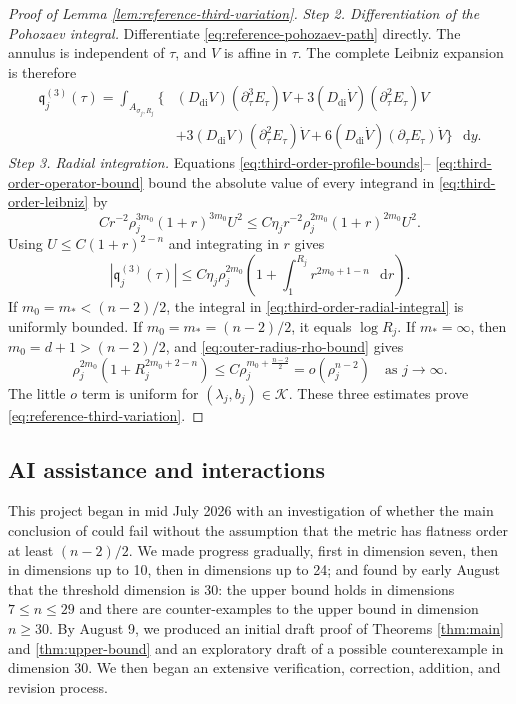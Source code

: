 \documentclass[11pt]{article}
\numberwithin{equation}{section}
\theoremstyle{remark}
\newcommand{\dd}{\mathop{}\!\mathrm{d}}
\begin{document}
\begin{proof}[Proof of Lemma  \ref{lem:reference-third-variation}]
\emph{Step 2. Differentiation of the Pohozaev integral.}
Differentiate \eqref{eq:reference-pohozaev-path} directly. The annulus is
independent of \(\tau\), and \(V\) is affine in \(\tau\). The complete Leibniz
expansion is therefore
\begin{equation}\label{eq:third-order-leibniz}
 \begin{aligned}
 \mathfrak q_j^{(3)}(\tau)
 =\int_{A_{\sigma_j,R_j}}\bigl\{
 &(D_{\mathrm{di}}V)(\partial_\tau^3E_\tau)V
 +3(D_{\mathrm{di}}\dot V)(\partial_\tau^2E_\tau)V\\
 &+3(D_{\mathrm{di}}V)(\partial_\tau^2E_\tau)\dot V
 +6(D_{\mathrm{di}}\dot V)(\partial_\tau E_\tau)\dot V
 \bigr\}\,\dd y.
\end{aligned}
\end{equation}
\emph{Step 3. Radial integration.}
Equations \eqref{eq:third-order-profile-bounds}--%
\eqref{eq:third-order-operator-bound} bound the absolute value of every
integrand in \eqref{eq:third-order-leibniz} by
\[
 Cr^{-2}\rho_j^{3m_0}(1+r)^{3m_0}U^2
 \le
 C\eta_jr^{-2}\rho_j^{2m_0}(1+r)^{2m_0}U^2.
\]
Using \(U\le C(1+r)^{2-n}\) and integrating in \(r\) gives
\begin{equation}\label{eq:third-order-radial-integral}
 |\mathfrak q_j^{(3)}(\tau)|
 \le
 C\eta_j\rho_j^{2m_0}
 \left(
 1+\int_1^{R_j}r^{2m_0+1-n}\,\dd r
 \right).
\end{equation}
{If \(m_0=m_*<(n-2)/2\), the integral in
\eqref{eq:third-order-radial-integral} is uniformly bounded. If
\(m_0=m_*=(n-2)/2\), it equals \(\log R_j\). If \(m_*=\infty\), then
\(m_0=d+1>(n-2)/2\), and \eqref{eq:outer-radius-rho-bound} gives}
\[
 \rho_j^{2m_0}\left(1+R_j^{2m_0+2-n}\right)
 \le C\rho_j^{m_0+\frac{n-2}{2}}
 =o(\rho_j^{n-2})
 \quad\text{as }j\to\infty.
\]
The little \(o\) term is uniform for
\((\lambda_j,b_j)\in\mathcal K\). {These three estimates prove
\eqref{eq:reference-third-variation}.}
\end{proof}



\subsection*{AI assistance and interactions}

This project began in mid July 2026 with an investigation of whether the main conclusion of \cite{HanXiongZhang} could fail without the assumption that the metric has flatness order at least \((n-2)/2\). We made progress gradually, first in dimension seven, then in dimensions up to 10,  then  in dimensions up to 24; and found by early August that the threshold dimension is 30:  the upper bound holds in dimensions \(7\le n \le 29\) and there are counter-examples to the upper bound in dimension \(n\ge 30\). By August 9, we produced an initial draft proof of Theorems  \ref{thm:main} and  \ref{thm:upper-bound}  and an exploratory draft of a possible counterexample in dimension \(30\). We then began an extensive verification, correction, addition, and revision process.
\end{document}
